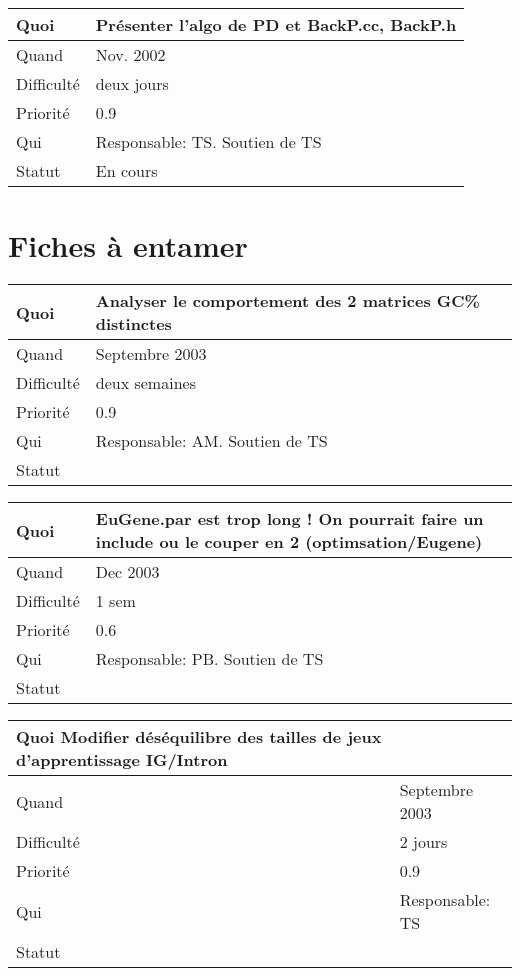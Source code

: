 \documentclass[a4paper,11pt]{article}
\begin{document}
\begin{longtable}{|l|p{7cm}|}\hline
  Quoi & Pr{\'e}senter l'algo de PD et BackP.cc, BackP.h \\\hline
  Quand  &  Nov. 2002\\\hline
  Difficult\'e & deux jours  \\\hline
  Priorit\'e &  0.9\\\hline
  Qui & Responsable: TS. Soutien de TS\\\hline
  Statut & En cours\\\hline
\end{longtable}


\section{Fiches \`a entamer}

\begin{longtable}{|l|p{7cm}|}\hline
  Quoi & Analyser le comportement des 2 matrices GC\% distinctes\\\hline
  Quand  &  Septembre 2003 \\\hline
  Difficult\'e & deux semaines \\\hline
  Priorit\'e &  0.9\\\hline
  Qui & Responsable: AM. Soutien de TS\\\hline
  Statut & \\\hline
\end{longtable}

\begin{longtable}{|l|p{7cm}|}\hline
  Quoi & EuGene.par est trop long ! On pourrait faire un include ou le couper en 2 (optimsation/Eugene)\\\hline
  Quand  &  Dec 2003\\\hline
  Difficult\'e & 1 sem \\\hline
  Priorit\'e &  0.6\\\hline
  Qui & Responsable: PB. Soutien de TS\\\hline
  Statut & \\\hline
\end{longtable}

\begin{longtable}{|l|p{7cm}|}\hline
  Quoi Modifier d\'es\'equilibre des tailles de jeux d'apprentissage IG/Intron& \\\hline
  Quand  &  Septembre 2003\\\hline
  Difficult\'e & 2 jours \\\hline
  Priorit\'e &  0.9 \\\hline
  Qui & Responsable: TS\\\hline
  Statut & \\\hline
\end{longtable}
\end{document}
